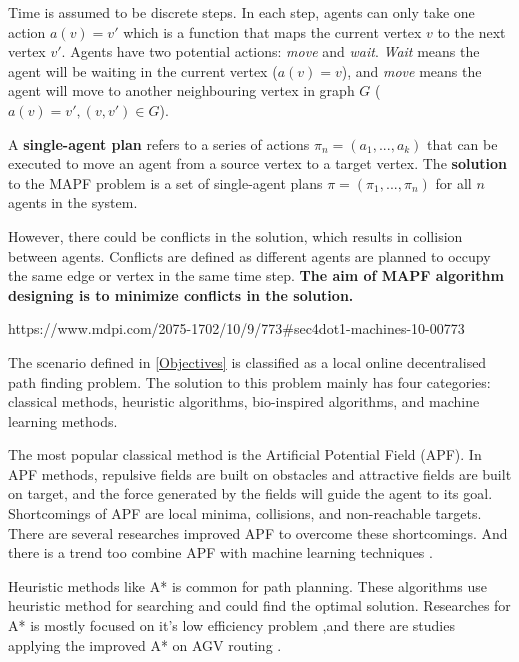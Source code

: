 \documentclass[12pt, oneside]{article}
\begin{document}
Time is assumed to be discrete steps. In each step, agents can only take one action $a(v)=v'$ which is a function that maps the current vertex $v$ to the next vertex $v'$. Agents have two potential actions: \textit{move} and \textit{wait}. \textit{Wait} means the agent will be waiting in the current vertex ($a(v)=v$), and \textit{move} means the agent will move to another neighbouring vertex in graph $G$ ($a(v)=v', (v,v')\in G$). 


A \textbf{single-agent plan} refers to a series of actions $\pi_{n} = (a_{1},...,a_{k})$ that can be executed to move an agent from a source vertex to a target vertex. The \textbf{solution} to the MAPF problem is a set of single-agent plans $\pi=(\pi_{1},...,\pi_{n})$ for all $n$ agents in the system. 

However, there could be conflicts in the solution, which results in collision between agents. Conflicts are defined as different agents are planned to occupy the same edge or vertex in the same time step. \textbf{The aim of MAPF algorithm designing is to minimize conflicts in the solution.}

https://www.mdpi.com/2075-1702/10/9/773#sec4dot1-machines-10-00773

The scenario defined in \ref{Objectives} is classified as a local online decentralised path finding problem. The solution to this problem mainly has four categories: classical methods, heuristic algorithms, bio-inspired algorithms, and machine learning methods. 

The most popular classical method is the Artificial Potential Field (APF). In APF methods, repulsive fields are built on obstacles and attractive fields are built on target, and the force generated by the fields will guide the agent to its goal. Shortcomings of APF are local minima, collisions, and non-reachable targets\cite{APF_flaw}. There are several researches improved APF \cite{APF_improv1} \cite{APF_improv2} to overcome these shortcomings. And there is a trend too combine APF with machine learning techniques \cite{APF_improv3} \cite{APF_improv4}. 

Heuristic methods like A* is common for path planning. These algorithms use heuristic method for searching and could find the optimal solution. Researches for A* is mostly focused on it's  low efficiency problem ,and there are studies applying the improved A* on AGV routing \cite{A*_1} \cite{A*_2}.
\end{document}
